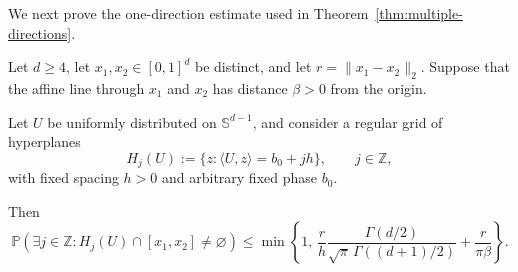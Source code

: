 We next prove the one-direction estimate used in
Theorem~\ref{thm:multiple-directions}.

\begin{lemma}
\label{lem:one-direction-bound}

Let $d\geq4$, let $x_1,x_2\in[0,1]^d$ be distinct, and let
$r=\|x_1-x_2\|_2$. Suppose that the affine line through $x_1$ and $x_2$ has
distance $\beta>0$ from the origin.

Let $U$ be uniformly distributed on $\mathbb{S}^{d-1}$, and consider
a regular grid of hyperplanes
\begin{equation}
    H_j(U)
    :=
    \{z:\langle U,z\rangle=b_0+jh\},
    \qquad
    j\in\mathbb{Z},
    \label{eq:infinite-hyperplane-grid}
\end{equation}
with fixed spacing $h>0$ and arbitrary fixed phase $b_0$.

Then
\begin{equation}
    \mathbb{P}
    \left(
        \exists j\in\mathbb{Z}:
        H_j(U)\cap[x_1,x_2]\neq\varnothing
    \right)
    \leq
    \min
    \left\{
        1,\,
        \frac{r}{h}
        \frac{\Gamma(d/2)}
             {\sqrt{\pi}\,\Gamma((d+1)/2)}
        +
        \frac{r}{\pi\beta}
    \right\}.
    \label{eq:general-one-direction-bound}
\end{equation}
\end{lemma}

